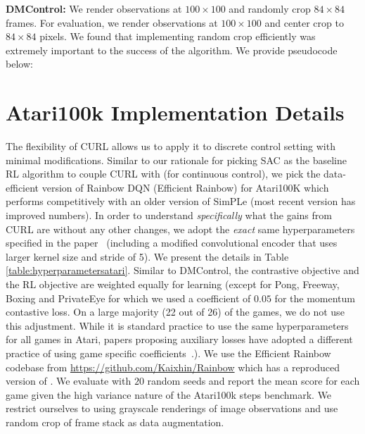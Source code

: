 {\textbf{DMControl:}} We render observations at $100 \times 100$ and randomly crop $84 \times 84$ frames. For evaluation, we render observations at $100 \times 100$ and center crop to $84 \times 84$ pixels. We found that implementing random crop efficiently was extremely important to the success of the algorithm. We provide pseudocode below:




\section{Atari100k Implementation Details}

The flexibility of CURL allows us to apply it to discrete control setting with minimal modifications. Similar to our rationale for picking SAC as the baseline RL algorithm to couple CURL with (for continuous control), we pick the data-efficient version of Rainbow DQN (Efficient Rainbow) \cite{van2019use} for Atari100K which performs competitively with an older version of SimPLe (most recent version has improved numbers). In order to understand {\it specifically} what the gains from CURL are without any other changes, we adopt the {\it exact} same hyperparameters specified in the paper~\cite{van2019use} (including a modified convolutional encoder that uses larger kernel size and stride of 5). We present the details in Table \ref{table:hyperparametersatari}. Similar to DMControl, the contrastive objective and the RL objective are weighted equally for learning (except for Pong, Freeway, Boxing and PrivateEye for which we used a coefficient of $0.05$ for the momentum contastive loss. On a large majority (22 out of 26) of the games, we do not use this adjustment. While it is standard practice to use the same hyperparameters for all games in Atari, papers proposing auxiliary losses have adopted a different practice of using game specific coefficients~\cite{jaderberg2016reinforcement}.). We use the Efficient Rainbow codebase from \url{https://github.com/Kaixhin/Rainbow} which has a reproduced version of \citet{van2019use}. We evaluate with $20$ random seeds and report the mean score for each game given the high variance nature of the Atari100k steps benchmark. We restrict ourselves to using grayscale renderings of image observations and use random crop of frame stack as data augmentation.


